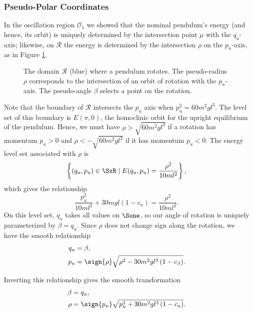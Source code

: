 \subsubsection*{Pseudo-Polar Coordinates}

In the oscillation region \(\mathcal{O}_1\) we showed that the nominal pendulum's
energy (and hence, its orbit) is uniquely determined by the intersection point
\(\mu\) with the \(q_u\)-axis;
likewise, on \(\mathcal{R}\) the energy is determined by the intersection
\(\rho\) on the \(p_u\)-axis, as in Figure \ref{fig:rho-intersection}.

\begin{figure}
    \centering
    
    \caption{The domain \(\mathcal{R}\) (blue) where a pendulum rotates. The
        pseudo-radius \(\rho\) corresponds to the intersection of an orbit of
        rotation with the \(p_u\)-axis. The pseudo-angle \(\beta\) selects a
        point on the rotation.}
    \label{fig:rho-intersection}
\end{figure}

Note that the boundary of \(\mathcal{R}\) intersects the \(p_u\) axis when 
\(p_u^2 = 60m^2 g l^3\). 
The level set of this boundary is \(E(\pi,0)\), the homoclinic orbit for the
upright equilibrium of the pendulum.
Hence, we must have \(\rho > \sqrt{60 m^2 g l^3}\) if a
rotation has momentum \(p_u > 0\) 
and \(\rho < -\sqrt{60 m^2 g l^3}\) if it has momentum \(p_u < 0\).
The energy level set associated with \(\rho\) is 
\[
    \left\{(q_u,p_u) \in \SxR \mid E(q_u,p_u) = \frac{\rho^2}{10ml^2}\right\}
    ,
\]
which gives the relationship
\begin{equation}\label{eqn:rotation-pu2}
    \frac{p_u^2}{10m l^2} + 30mgl(1 - c_u) = \frac{\rho^2}{10 ml^2}
    .
\end{equation}
On this level set, \(q_u\) takes all values on \(\Sone\), so our angle of
rotation is uniquely parameterized by \(\beta = q_u\).
Since \(\rho\) does not change sign along the rotation, we have the smooth
relationship
\begin{align}\label{eqn:rotation-Tinv}
    q_u &= \beta
    , \\
    p_u &= \sign{\rho}\sqrt{\rho^2 - 30 m^2 g l^3\left(1 - c_\beta \right)}
    .
\end{align}

Inverting this relationship gives the smooth transformation
\begin{align}\label{eqn:rotation-T}
    \beta &= q_u
    , \\
    \rho &= \sign{p_u}\sqrt{p_u^2 + 30 m^2 g l^3 \left(1 - c_u \right)}
    .
\end{align}

